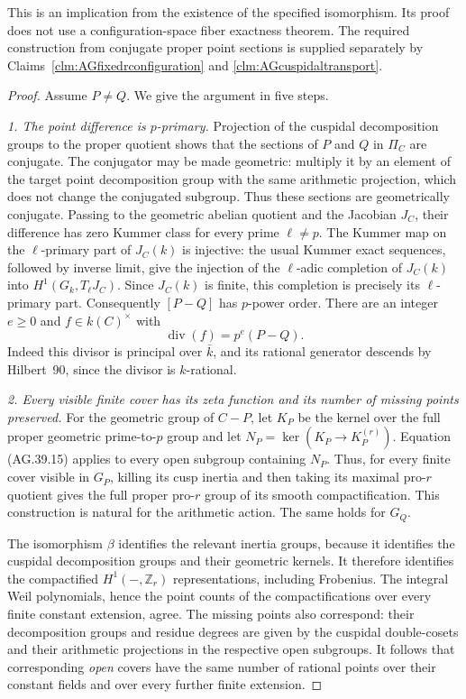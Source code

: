 This is an implication from the existence of the specified
isomorphism. Its proof does not use a configuration-space
fiber exactness theorem. The required construction from
conjugate proper point sections is supplied separately by
Claims~\ref{clm:AGfixedrconfiguration} and
\ref{clm:AGcuspidaltransport}.

\begin{proof}
Assume \(P\ne Q\). We give the argument in five steps.

\emph{1. The point difference is \(p\)-primary.}
Projection of the cuspidal decomposition groups to the
proper quotient shows that the sections of \(P\) and
\(Q\) in \(\Pi_C\) are conjugate. The conjugator
may be made geometric: multiply it by an element of
the target point decomposition group with the same
arithmetic projection, which does not change the
conjugated subgroup. Thus these sections are
geometrically conjugate. Passing
to the geometric abelian quotient and the Jacobian
\(J_C\), their difference has zero Kummer class for
every prime \(\ell\ne p\). The Kummer map on the
\(\ell\)-primary part of \(J_C(k)\) is injective:
the usual Kummer exact sequences, followed by inverse
limit, give the injection of the \(\ell\)-adic
completion of \(J_C(k)\) into
\(H^1(G_k,T_\ell J_C)\). Since \(J_C(k)\) is finite,
this completion is precisely its \(\ell\)-primary part.
Consequently \([P-Q]\) has \(p\)-power order. There are
an integer \(e\geq0\) and \(f\in k(C)^\times\) with
\[
                  \operatorname{div}(f)=p^e(P-Q).
                                                        \tag{AG.40.1}
\]
Indeed this divisor is principal over \(\bar k\), and
its rational generator descends by Hilbert~90, since
the divisor is \(k\)-rational.

\emph{2. Every visible finite cover has its zeta function
and its number of missing points preserved.}
For the geometric group of \(C-P\), let \(K_P\) be
the kernel over the full proper geometric prime-to-\(p\)
group and let \(N_P=\ker(K_P\to K_P^{(r)})\).
Equation (AG.39.15) applies to every open subgroup
containing \(N_P\). Thus, for every finite cover
visible in \(G_P\), killing its cusp inertia and then
taking its maximal pro-\(r\) quotient gives the full
proper pro-\(r\) group of its smooth compactification.
This construction is natural for the arithmetic action.
The same holds for \(G_Q\).

The isomorphism \(\beta\) identifies the relevant
inertia groups, because it identifies the cuspidal
decomposition groups and their geometric kernels.
It therefore identifies the compactified
\(H^1(-,\mathbb Z_r)\) representations, including
Frobenius. The integral Weil polynomials, hence the
point counts of the compactifications over every
finite constant extension, agree. The missing points
also correspond: their decomposition groups and
residue degrees are given by the cuspidal
double-cosets and their arithmetic projections in
the respective open subgroups. It follows that
corresponding \emph{open} covers have the same
number of rational points over their constant
fields and over every further finite extension.


\end{proof}
